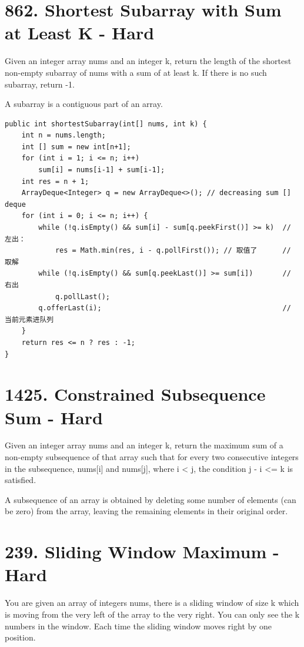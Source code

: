 \documentclass[9pt, b5paaper]{book}
\begin{document}
\section{862. Shortest Subarray with Sum at Least K - Hard}
\label{sec-12-2}
Given an integer array nums and an integer k, return the length of the shortest non-empty subarray of nums with a sum of at least k. If there is no such subarray, return -1.

A subarray is a contiguous part of an array.
\begin{verbatim}
public int shortestSubarray(int[] nums, int k) { 
    int n = nums.length;
    int [] sum = new int[n+1];  
    for (int i = 1; i <= n; i++)  
        sum[i] = nums[i-1] + sum[i-1];
    int res = n + 1;
    ArrayDeque<Integer> q = new ArrayDeque<>(); // decreasing sum [] deque
    for (int i = 0; i <= n; i++) {
        while (!q.isEmpty() && sum[i] - sum[q.peekFirst()] >= k)  // 左出：
            res = Math.min(res, i - q.pollFirst()); // 取值了      // 取解
        while (!q.isEmpty() && sum[q.peekLast()] >= sum[i])       // 右出
            q.pollLast();  
        q.offerLast(i);                                           // 当前元素进队列
    }
    return res <= n ? res : -1;
}
\end{verbatim}

\section{1425. Constrained Subsequence Sum - Hard}
\label{sec-12-3}
Given an integer array nums and an integer k, return the maximum sum of a non-empty subsequence of that array such that for every two consecutive integers in the subsequence, nums[i] and nums[j], where i < j, the condition j - i <= k is satisfied.

A subsequence of an array is obtained by deleting some number of elements (can be zero) from the array, leaving the remaining elements in their original order.

\section{239. Sliding Window Maximum - Hard}
\label{sec-12-4}
You are given an array of integers nums, there is a sliding window of size k which is moving from the very left of the array to the very right. You can only see the k numbers in the window. Each time the sliding window moves right by one position.
\end{document}
